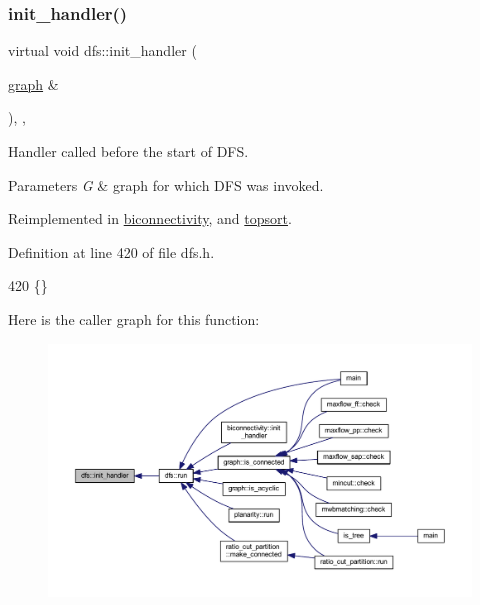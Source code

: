 \subsubsection{\texorpdfstring{init\+\_\+handler()}{init\_handler()}}
{\footnotesize\ttfamily virtual void dfs\+::init\+\_\+handler (\begin{DoxyParamCaption}\item[{\mbox{\hyperlink{classgraph}{graph}} \&}]{ }\end{DoxyParamCaption})\hspace{0.3cm}{\ttfamily [inline]}, {\ttfamily [virtual]}, {\ttfamily [inherited]}}



Handler called before the start of D\+FS. 


\begin{DoxyParams}{Parameters}
{\em G} & graph for which D\+FS was invoked. \\
\hline
\end{DoxyParams}


Reimplemented in \mbox{\hyperlink{classbiconnectivity_a64adab869e0080e3a1f8479e70010317}{biconnectivity}}, and \mbox{\hyperlink{classtopsort_a21aaf28fc280094ed43288e58d8e3ae1}{topsort}}.



Definition at line 420 of file dfs.\+h.


\begin{DoxyCode}
420 \{\}
\end{DoxyCode}
Here is the caller graph for this function\+:
\nopagebreak
\begin{figure}[H]
\begin{center}
\leavevmode
\includegraphics[width=350pt]{classdfs_aae46a50d0c73c63bf72e483668fd22a2_icgraph}
\end{center}
\end{figure}
\mbox{\label{classmydfs_ad5c5cf421b7a3f6d6d6d3b4eba305879}} 
